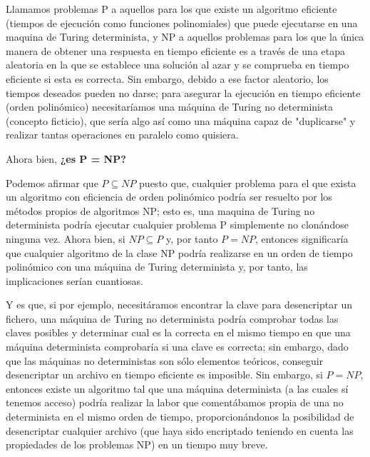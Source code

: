 \documentclass[a4paper, 11pt]{article}
\begin{document}




\pagebreak


Llamamos problemas P a aquellos para los que existe un algoritmo eficiente (tiempos de ejecución como funciones polinomiales) que puede ejecutarse en una maquina de Turing determinista, y NP a aquellos problemas para los que la única manera de obtener una respuesta en tiempo eficiente es a través de una etapa aleatoria en la que se establece una solución al azar y se comprueba en tiempo eficiente si esta es correcta. Sin embargo, debido a ese factor aleatorio, los tiempos deseados pueden no darse; para asegurar la ejecución en tiempo eficiente (orden polinómico) necesitaríamos una máquina de Turing no determinista (concepto ficticio), que sería algo así como una máquina capaz de "duplicarse" y realizar tantas operaciones en paralelo como quisiera. 

Ahora bien, \textbf{ ¿es P = NP?}

Podemos afirmar que $ P \subseteq NP $ puesto que, cualquier problema para el que exista un algoritmo con eficiencia de orden polinómico podría ser resuelto por los métodos propios de algoritmos NP; esto es, una maquina de Turing no determinista podría ejecutar cualquier problema P simplemente no clonándose ninguna vez. Ahora bien, si $NP \subseteq P $ y, por tanto $ P = NP $, entonces significaría que cualquier algoritmo de la clase NP podría realizarse en un orden de tiempo polinómico con una máquina de Turing determinista y, por tanto, las implicaciones serían cuantiosas.

Y es que, si por ejemplo, necesitáramos encontrar la clave para desencriptar un fichero, una máquina de Turing no determinista podría comprobar todas las claves posibles y determinar cual es la correcta en el mismo tiempo en que una máquina determinista comprobaría si una clave es correcta; sin embargo, dado que las máquinas no deterministas son sólo elementos teóricos, conseguir desencriptar un archivo en tiempo eficiente es imposible. Sin embargo, si $ P = NP $, entonces existe un algoritmo tal que una máquina determinista (a las cuales sí tenemos acceso) podría realizar la labor que comentábamos propia de una no determinista en el mismo orden de tiempo, proporcionándonos la posibilidad de desencriptar cualquier archivo (que haya sido encriptado teniendo en cuenta las propiedades de los problemas NP) en un tiempo muy breve.
\end{document}
